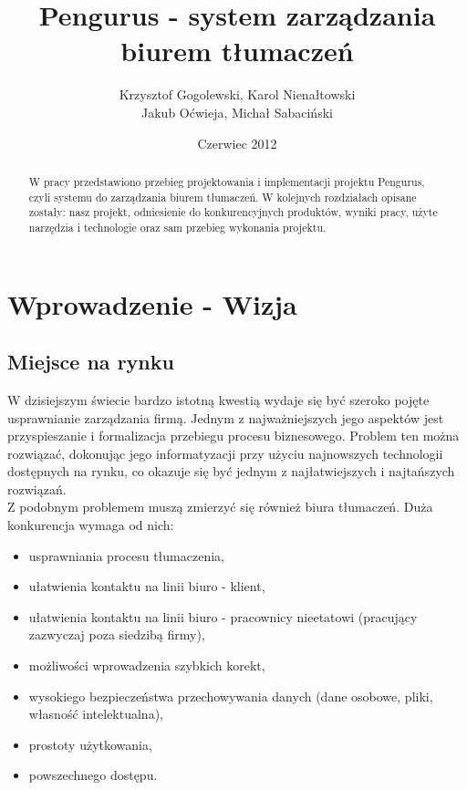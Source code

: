 \documentclass[licencjacka]{pracamgr}
\author{Krzysztof Gogolewski, Karol Nienałtowski\\Jakub Oćwieja, Michał Sabaciński}
\title{Pengurus - system zarządzania biurem tłumaczeń}
\date{Czerwiec 2012}
\begin{document}
\maketitle

\begin{abstract}
  W pracy przedstawiono przebieg projektowania i implementacji projektu Pengurus, czyli systemu do zarządzania biurem tłumaczeń.
  W kolejnych rozdziałach opisane zostały: nasz projekt, odniesienie do konkurencyjnych produktów, wyniki pracy, użyte narzędzia i technologie oraz sam przebieg wykonania projektu.
\end{abstract}

\tableofcontents

\chapter{Wprowadzenie - Wizja}
\section{Miejsce na rynku}
W dzisiejszym świecie bardzo istotną kwestią wydaje się być szeroko pojęte usprawnianie zarządzania firmą. 
Jednym z najważniejszych jego aspektów jest przyspieszanie i formalizacja przebiegu procesu biznesowego. 
Problem ten można rozwiązać, dokonując jego informatyzacji przy użyciu najnowszych technologii dostępnych na rynku, co okazuje się być jednym z najłatwiejszych i najtańszych rozwiązań. \\

Z podobnym problemem muszą zmierzyć się również biura tłumaczeń. Duża konkurencja wymaga od nich: 
\begin{itemize}
\item usprawniania procesu tłumaczenia, 
\item ułatwienia kontaktu na linii biuro - klient, 
\item ułatwienia kontaktu na linii biuro - pracownicy nieetatowi (pracujący zazwyczaj poza siedzibą firmy), 
\item możliwości wprowadzenia szybkich korekt,
\item wysokiego bezpieczeństwa przechowywania danych (dane osobowe, pliki, własność intelektualna),
\item prostoty użytkowania,
\item powszechnego dostępu. 
\end{itemize} 
\end{document}
